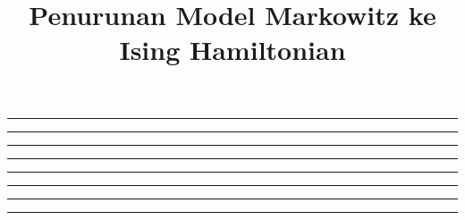 \documentclass[12pt,a4paper]{article}
\title{Penurunan Model Markowitz ke Ising Hamiltonian}
\author{}
\date{}
\begin{document}
\maketitle
\tableofcontents
\newpage



\vspace{1em}
\begin{center}\rule{0.5\linewidth}{0.5pt}\end{center}



\vspace{1em}
\begin{center}\rule{0.5\linewidth}{0.5pt}\end{center}



\vspace{1em}
\begin{center}\rule{0.5\linewidth}{0.5pt}\end{center}



\vspace{1em}
\begin{center}\rule{0.5\linewidth}{0.5pt}\end{center}



\vspace{1em}
\begin{center}\rule{0.5\linewidth}{0.5pt}\end{center}



\vspace{1em}
\begin{center}\rule{0.5\linewidth}{0.5pt}\end{center}



\vspace{1em}
\begin{center}\rule{0.5\linewidth}{0.5pt}\end{center}



\vspace{1em}
\begin{center}\rule{0.5\linewidth}{0.5pt}\end{center}




\newpage
\appendix
\renewcommand{\thesection}{Appendix~\Alph{section}}
\renewcommand{\thesubsection}{\Alph{section}.\arabic{subsection}}
\renewcommand{\thesubsubsection}{\Alph{section}.\arabic{subsection}.\arabic{subsubsection}}
\end{document}
